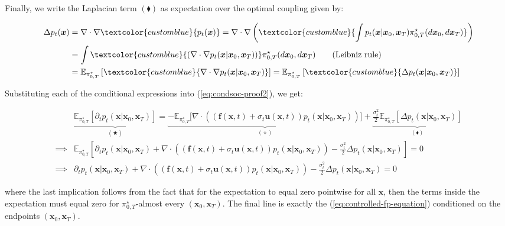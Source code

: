 \documentclass{article}
\newcommand{\bluetext}[1]{\textcolor{customblue}{#1}}
\begin{document}
Finally, we write the Laplacian term $(\blacklozenge)$ as expectation over the optimal coupling given by:
\begin{small}
\begin{align}
    \Delta p_t(\boldsymbol{x})&=\nabla\cdot \nabla \bluetext{p_t(\boldsymbol{x})}=\nabla\cdot \nabla \left(\bluetext{\int p_t(\boldsymbol{x}|\boldsymbol{x}_0, \boldsymbol{x}_T)\pi_{0,T}^\star(d\boldsymbol{x}_0, d\boldsymbol{x}_T)}\right)\nonumber\\
    &=\int\bluetext{\left(\nabla\cdot \nabla p_t(\boldsymbol{x}|\boldsymbol{x}_0, \boldsymbol{x}_T)\right)}\pi_{0,T}^\star(d\boldsymbol{x}_0, d\boldsymbol{x}_T)\tag{Leibniz rule}\\
    &=\mathbb{E}_{\pi_{0,T}^\star}\left[\bluetext{\nabla\cdot \nabla p_t(\boldsymbol{x}|\boldsymbol{x}_0, \boldsymbol{x}_T)}\right]=\mathbb{E}_{\pi_{0,T}^\star}\left[\bluetext{\Delta p_t(\boldsymbol{x}|\boldsymbol{x}_0, \boldsymbol{x}_T)}\right]
\end{align}
\end{small}

Substituting each of the conditional expressions into (\ref{eq:condsoc-proof2}), we get:
\begin{small}
\begin{align}
   & \underbrace{\mathbb{E}_{\pi^\star_{0,T}}\left[\partial_tp_t(\boldsymbol{x}|\boldsymbol{x}_0, \boldsymbol{x}_T)\right]}_{(\bigstar)}=\underbrace{-\mathbb{E}_{\pi_{0,T}^\star}\bigg[\nabla\cdot \left((\boldsymbol{f}(\boldsymbol{x},t)+\sigma_t\boldsymbol{u}(\boldsymbol{x},t)) p_t(\boldsymbol{x}|\boldsymbol{x}_0, \boldsymbol{x}_T)\right)\bigg]}_{(\diamond)}+\underbrace{\frac{\sigma_t^2}{2}\mathbb{E}_{\pi_{0,T}^\star}\left[\Delta p_t(\boldsymbol{x}|\boldsymbol{x}_0, \boldsymbol{x}_T)\right]}_{(\blacklozenge)}\nonumber\\
    \implies & \mathbb{E}_{\pi^\star_{0,T}}\left[\partial_tp_t(\boldsymbol{x}|\boldsymbol{x}_0, \boldsymbol{x}_T)+\nabla\cdot \left((\boldsymbol{f}(\boldsymbol{x},t)+\sigma_t\boldsymbol{u}(\boldsymbol{x},t)) p_t(\boldsymbol{x}|\boldsymbol{x}_0, \boldsymbol{x}_T)\right)-\frac{\sigma_t^2}{2}\Delta p_t(\boldsymbol{x}|\boldsymbol{x}_0, \boldsymbol{x}_T)\right]=0\nonumber\\
    \implies & \boxed{\partial_tp_t(\boldsymbol{x}|\boldsymbol{x}_0, \boldsymbol{x}_T)+\nabla\cdot \left((\boldsymbol{f}(\boldsymbol{x},t)+\sigma_t\boldsymbol{u}(\boldsymbol{x},t)) p_t(\boldsymbol{x}|\boldsymbol{x}_0, \boldsymbol{x}_T)\right)-\frac{\sigma_t^2}{2}\Delta p_t(\boldsymbol{x}|\boldsymbol{x}_0, \boldsymbol{x}_T)=0}\tag{Conditional FP Equation}\label{eq:conditional-fp-equation}
\end{align}
\end{small}
where the last implication follows from the fact that for the expectation to equal zero pointwise for all $\boldsymbol{x}$, then the terms inside the expectation must equal zero for $\pi_{0,T}^\star$-almost every $(\boldsymbol{x}_0, \boldsymbol{x}_T)$. The final line is exactly the (\ref{eq:controlled-fp-equation}) conditioned on the endpoints $(\boldsymbol{x}_0, \boldsymbol{x}_T)$.
\end{document}

